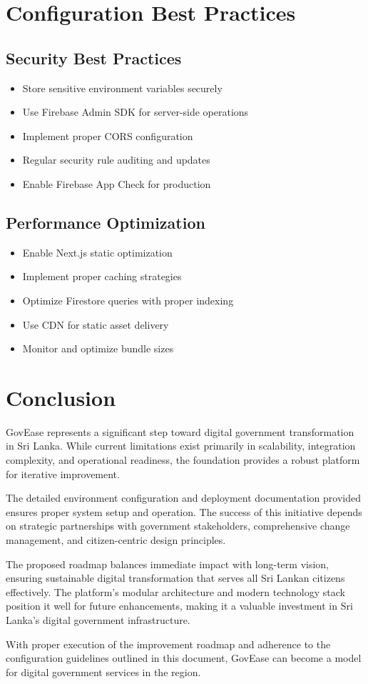 \documentclass[12pt,a4paper]{article}
\begin{document}
\section{Configuration Best Practices}

\subsection{Security Best Practices}

\begin{itemize}[leftmargin=*]
    \item Store sensitive environment variables securely
    \item Use Firebase Admin SDK for server-side operations
    \item Implement proper CORS configuration
    \item Regular security rule auditing and updates
    \item Enable Firebase App Check for production
\end{itemize}

\subsection{Performance Optimization}

\begin{itemize}[leftmargin=*]
    \item Enable Next.js static optimization
    \item Implement proper caching strategies
    \item Optimize Firestore queries with proper indexing
    \item Use CDN for static asset delivery
    \item Monitor and optimize bundle sizes
\end{itemize}

\section{Conclusion}

GovEase represents a significant step toward digital government transformation in Sri Lanka. While current limitations exist primarily in scalability, integration complexity, and operational readiness, the foundation provides a robust platform for iterative improvement.

The detailed environment configuration and deployment documentation provided ensures proper system setup and operation. The success of this initiative depends on strategic partnerships with government stakeholders, comprehensive change management, and citizen-centric design principles.

The proposed roadmap balances immediate impact with long-term vision, ensuring sustainable digital transformation that serves all Sri Lankan citizens effectively. The platform's modular architecture and modern technology stack position it well for future enhancements, making it a valuable investment in Sri Lanka's digital government infrastructure.

With proper execution of the improvement roadmap and adherence to the configuration guidelines outlined in this document, GovEase can become a model for digital government services in the region.
\end{document}
